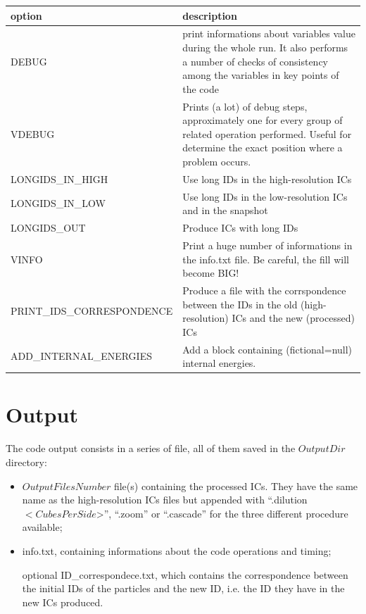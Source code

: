 \documentclass[11pt,a4paper,titlepage]{article}
\newcommand{\virg}[1]{``{#1}''}
\begin{document}
\begin{longtable}{l|p{6cm}}
\textbf{option}                    &  \textbf{description} \\
\hline
DEBUG                              &  print informations about variables value during the whole run. It also performs a number of checks of consistency among the variables in key points of the code \\
VDEBUG                             &  Prints (a lot) of debug steps, approximately one for every group of related operation performed. Useful for determine the exact position where a problem occurs. \\
LONGIDS\_IN\_HIGH                  &  Use long IDs in the high-resolution ICs \\
LONGIDS\_IN\_LOW                   &  Use long IDs in the low-resolution ICs and in the snapshot \\
LONGIDS\_OUT                       &  Produce ICs with long IDs \\
VINFO                              &  Print a huge number of informations in the info.txt file. Be careful, the fill will become BIG! \\
PRINT\_IDS\_CORRESPONDENCE         &  Produce a file with the corrspondence between the IDs in the old (high-resolution) ICs and the new (processed) ICs \\
ADD\_INTERNAL\_ENERGIES            &  Add a block containing (fictional=null) internal energies. \\
\hline
\end{longtable}

\section{Output}
The code output consists in a series of file, all of them saved in the $OutputDir$ directory:
\begin{itemize}
\item $OutputFilesNumber$ file(s) containing the processed ICs. They have the same name as the high-resolution ICs files but appended with \virg{.dilution$<CubesPerSide$>}, \virg{.zoom} or \virg{.cascade} for the three different procedure available;
\item info.txt, containing informations about the code operations and timing;
\item [optional] ID\_correspondece.txt, which contains the correspondence between the initial IDs of the particles and the new ID, i.e. the ID they have in the new ICs produced.
\end{itemize}
\end{document}
